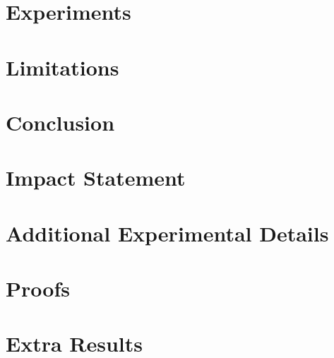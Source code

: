\documentclass{article}
\theoremstyle{plain}
\theoremstyle{definition}
\theoremstyle{remark}
\begin{document}
\section{Experiments}

\section{Limitations}

\section{Conclusion}

\section*{Impact Statement}





\appendix

\section{Additional Experimental Details}
\section{Proofs}
\section{Extra Results}
\end{document}
